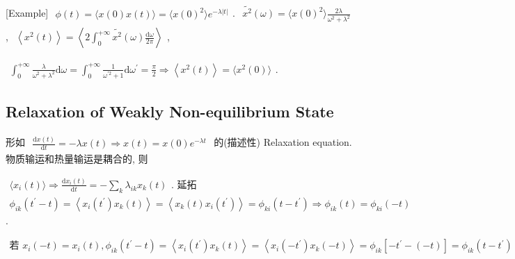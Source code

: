 \documentclass[../../main.tex]{subfiles}
\begin{document}
[Example] $\begin{aligned}
    \phi(t) = \langle x(0)x(t)\rangle = \langle x(0)^{2}\rangle e^{-\lambda|t|}
\end{aligned}$. $\begin{aligned}
    \widetilde{x^{2}}(\omega) = \langle x(0)^{2}\rangle \frac{2\lambda}{\omega^{2} + \lambda^{2}}
\end{aligned}$, $\begin{aligned}
    \left\langle x^{2}(t)\right\rangle 
    = \left\langle 2\int_{0}^{+\infty}\widetilde{x^{2}}(\omega)\frac{\mathrm{d}\omega}{2\pi}\right\rangle 
\end{aligned}$, 
    
    $\begin{aligned}\int_{0}^{+\infty}\frac{\lambda}{\omega^{2}+\lambda^{2}}\mathrm{d}\omega = \int_{0}^{+\infty}\frac{1}{\omega^{\prime 2}+1}\mathrm{d}\omega^{\prime} = \frac{\pi}{2}\Rightarrow \left\langle x^{2}(t)\right\rangle = \langle x^{2}(0)\rangle
\end{aligned}$. 

\subsection{Relaxation of Weakly Non-equilibrium State}

形如 $\begin{aligned}
    \frac{\mathrm{d}x(t)}{\mathrm{d}t} = -\lambda x(t)\Rightarrow x(t) = x(0)e^{-\lambda t}
\end{aligned}$ 的(描述性) Relaxation equation. 物质输运和热量输运是耦合的, 则 

$\begin{aligned}
    \langle x_{i}(t)\rangle\Rightarrow \frac{\mathrm{d}x_{i}(t)}{\mathrm{d}t} = -\sum_{k}\lambda_{ik}x_{k}(t)
\end{aligned}$. 延拓 $\begin{aligned}
    \phi_{ik}\left(t^{\prime}-t\right) = \left\langle x_{i}\left(t^{\prime}\right)x_{k}(t)\right\rangle = \left\langle x_{k}(t)x_{i}\left(t^{\prime}\right)\right\rangle = \phi_{ki}\left(t-t^{\prime}\right)\Rightarrow \boxed{\phi_{ik}(t) = \phi_{ki}(-t)}
\end{aligned}$.

$\begin{aligned}
    \text{若 }x_{i}(-t) = x_{i}(t), \phi_{ik}\left(t^{\prime}-t\right) 
    = \left\langle x_{i}\left(t^{\prime}\right)x_{k}(t)\right\rangle 
    = \left\langle x_{i}\left(-t^{\prime}\right)x_{k}(-t)\right\rangle = \phi_{ik}\left[-t^{\prime}-(-t)\right] = \phi_{ik}\left(t-t^{\prime}\right)\Rightarrow \phi_{ik}(t) = \phi_{ik}(-t)
\end{aligned}$
\end{document}

